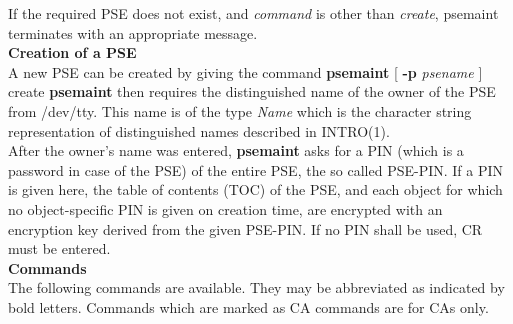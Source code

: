 If the required PSE does not exist,
and {\em command} is other than {\em create}, psemaint terminates with an appropriate message.
\\ [1em]
{\bf Creation of a PSE}
\\ [1em]
A new PSE can be created by giving the command 
\bc
{\bf psemaint} [ {\bf -p} {\em psename} ] create
\ec
{\bf psemaint} then requires the distinguished name of the owner of the PSE from /dev/tty.
This name is of the type {\em Name} which is the character string representation
of distinguished names described in INTRO(1).
\\ [1em]
After the owner's name was entered, {\bf psemaint} asks for a PIN (which is a password in case
of the PSE) of the entire PSE, the so called PSE-PIN. If a PIN is given here, 
the table of contents (TOC) of the PSE,
and each object for which no object-specific PIN is given on creation time, are encrypted with an 
encryption
key derived from the given PSE-PIN. If no PIN shall be used, CR must be entered. 
\\ [1em]
{\bf Commands} 
\\ [1em]
The following commands are available. They may be abbreviated as indicated by bold letters.
Commands which are marked as CA commands are for CAs only.
\\ [1em]
